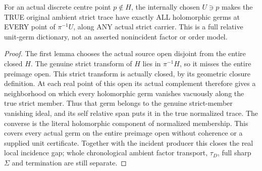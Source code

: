 \begin{theorem}
\label{hir:sharp-actual-nonincident-discrete-member-strict-trace-unit-open}
\leanok
For an actual discrete centre point $p\notin H$, the internally chosen
$U\ni p$ makes the TRUE original ambient strict trace have exactly ALL
holomorphic germs at EVERY point of $\pi^{-1}U$, along ANY actual strict
carrier. This is a full relative unit-germ dictionary, not an asserted
nonincident factor or order model.
\end{theorem}
\begin{proof}
The first lemma chooses the actual source open disjoint from the entire
closed $H$. The genuine strict transform of $H$ lies in $\pi^{-1}H$,
so it misses the entire preimage open. This strict transform is actually
closed, by its geometric closure definition. At each real point of this
open its actual complement therefore gives a neighborhood on which every
holomorphic germ vanishes vacuously along the true strict member. Thus
that germ belongs to the genuine strict-member vanishing ideal, and its
self relative span puts it in the true normalized trace. The converse is
the literal holomorphic component of normalized membership. This covers
every actual germ on the entire preimage open without coherence or a
supplied unit certificate. Together with the incident producer this
closes the real local incidence gap; whole chronological ambient factor
transport, $\tau_D$, full sharp $\Sigma$ and termination are still separate.
\end{proof}
